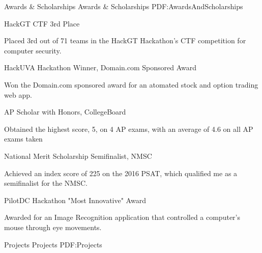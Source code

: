 \documentclass[letterpaper,MMMyyyy,nonstopmode]{style}
\begin{document}
\begin{Body}
\begin{comment}
\begingroup
\renewcommand{\MaxNumberedItem}{[8888]}

\Gap
\NumberedItem{[1]}
{\underline{Kevin Zou} and Amarda Shehu,
``Memetic Evolutionary Algorithms for De-novo Protein Structure Prediction,''
\textit{ACM Bioinformatics and Computational Biology Conference, 2018}. In Preparation.}

\endgroup
\end{comment}


\Section
{Awards \&\newline
Scholarships}
{Awards \& Scholarships}
{PDF:AwardsAndScholarships}

\Gap
\BulletItem
HackGT CTF 3rd Place
\hfill
{}
\begin{Detail}
\Item
Placed 3rd out of 71 teams in the HackGT Hackathon's CTF competition for computer security.
\end{Detail}


\Gap
\BulletItem
HackUVA Hackathon Winner, Domain.com Sponsored Award
\hfill
{}
\begin{Detail}
\Item
Won the Domain.com sponsored award for an atomated stock and option trading web app.
\end{Detail}

\Gap
\BulletItem
AP Scholar with Honors,
CollegeBoard
\hfill
{}
\begin{Detail}
\Item
Obtained the highest score, 5, on 4 AP exams, with an average of 4.6 on all AP exams taken\end{Detail}

\Gap
\BulletItem
National Merit Scholarship Semifinalist, NMSC
\hfill
{}
\begin{Detail}
\Item
Achieved an index score of 225 on the 2016 PSAT, which qualified me as a semifinalist for the NMSC.
\end{Detail}

\BulletItem
PilotDC Hackathon "Most Innovative" Award
\hfill
{}
\begin{Detail}
\Item
Awarded for an Image Recognition application that controlled a computer's mouse through eye movements.
\end{Detail}


\Section
{Projects}
{Projects}
{PDF:Projects}


\end{Body}
\end{document}
